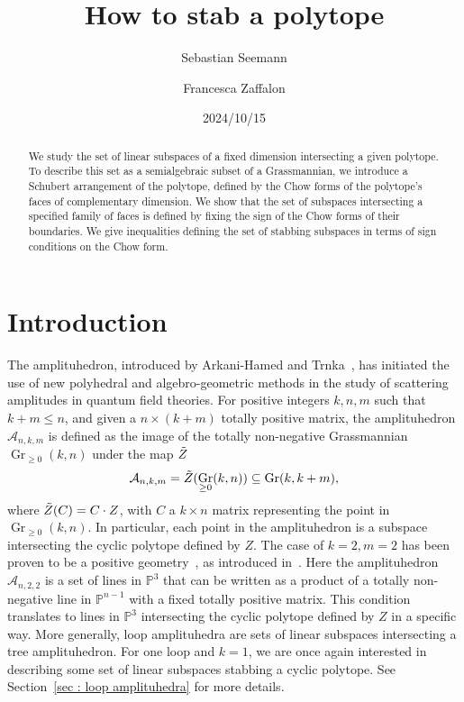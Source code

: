 \documentclass[english]{ourlematema}
\title{How to stab a polytope}
\author{Sebastian Seemann}
\author{Francesca Zaffalon}
\date{2024/10/15}
\DeclareMathOperator{\Gr}{Gr}
\newcommand{\mA}{\mathcal{A}}
\newcommand{\PP}{\mathbb{P}}
\begin{document}
\maketitle

\begin{abstract}
    \noindent We study the set of linear subspaces of a fixed dimension intersecting a given polytope.
    To describe this set as a semialgebraic subset of a Grassmannian, we introduce a Schubert arrangement of the polytope, defined by the Chow forms of the polytope’s faces of complementary dimension.
    We show that the set of subspaces intersecting a specified family of faces is defined by fixing the sign of the Chow forms of their boundaries. We give inequalities defining the set of stabbing subspaces in terms of sign conditions on the Chow form.
\end{abstract}

\section{Introduction}

The amplituhedron, introduced by Arkani-Hamed and Trnka~\cite{amplituhedron}, has initiated the use of new polyhedral and algebro-geometric methods in the study of scattering amplitudes in quantum field theories. 
For positive integers $k,n,m$ such that $k+m \leq n$, and given a $n\times(k+m)$ totally positive matrix, the amplituhedron $\mA_{n,k,m}$ is defined as the image of the totally non-negative Grassmannian $\Gr_{\geq 0}(k,n)$ under the map $\Tilde{Z}$
\[ \mA_{n,k,m} = \Tilde{Z}(\Gr_{\geq 0}(k,n)) \subseteq \Gr(k,k+m), \]
where $\Tilde{Z}(C) = C\cdot Z$, with $C$ a $k\times n$ matrix representing the point in $\Gr_{\geq 0}(k,n)$.
In particular, each point in the amplituhedron is a subspace intersecting the cyclic polytope defined by $Z$.
The case of $k=2,m=2$ has been proven to be a positive geometry~\cite{Simonampl}, as introduced in~\cite{PositiveGeometryandCanonicalForms}. 
Here the amplituhedron $\mA_{n,2,2}$ is a set of lines in $\PP^3$ that can be written as a product of a totally non-negative line in $\PP^{n-1}$ with a fixed totally positive matrix. This condition translates to lines in $\PP^3$ intersecting the cyclic polytope defined by $Z$ in a specific way.
More generally, loop amplituhedra are sets of linear subspaces intersecting a tree amplituhedron. For one loop and $k=1$, we are once again interested in describing some set of linear subspaces stabbing a cyclic polytope. See Section~\ref{sec : loop amplituhedra} for more details.
\end{document}
